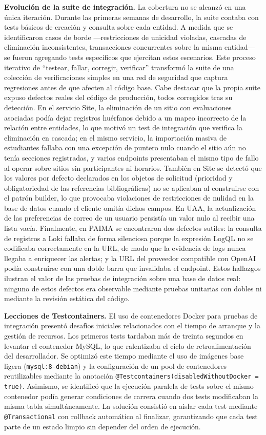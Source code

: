 \textbf{Evolución de la suite de integración.} La cobertura no se alcanzó en
una única iteración. Durante las primeras semanas de desarrollo, la suite
contaba con tests básicos de creación y consulta sobre cada entidad. A medida
que se identificaron casos de borde ---restricciones de unicidad violadas,
cascadas de eliminación inconsistentes, transacciones concurrentes sobre la
misma entidad--- se fueron agregando tests específicos que ejercitan estos
escenarios. Este proceso iterativo de ``testear, fallar, corregir,
verificar'' transformó la suite de una colección de verificaciones simples en
una red de seguridad que captura regresiones antes de que afecten al
código base. Cabe destacar que la propia suite expuso defectos reales del
código de producción, todos corregidos tras su detección. En el servicio Site,
la eliminación de un sitio con evaluaciones asociadas podía dejar registros
huérfanos debido a un mapeo incorrecto de la relación entre entidades, lo que
motivó un test de integración que verifica la eliminación en cascada; en el
mismo servicio, la importación masiva de estudiantes fallaba con una excepción
de puntero nulo cuando el sitio aún no tenía secciones registradas, y varios
endpoints presentaban el mismo tipo de fallo al operar sobre sitios sin
participantes ni horarios. También en Site se detectó que los valores por
defecto declarados en los objetos de solicitud (prioridad y obligatoriedad de
las referencias bibliográficas) no se aplicaban al construirse con el patrón
builder, lo que provocaba violaciones de restricciones de nulidad en la base
de datos cuando el cliente omitía dichos campos. En UAA, la actualización de
las preferencias de correo de un usuario persistía un valor nulo al recibir
una lista vacía. Finalmente, en PAIMA se encontraron dos defectos sutiles: la
consulta de registros a Loki fallaba de forma silenciosa porque la expresión
LogQL no se codificaba correctamente en la URL, de modo que la evidencia de
logs nunca llegaba a enriquecer las alertas; y la URL del proveedor compatible
con OpenAI podía construirse con una doble barra que invalidaba el endpoint.
Estos hallazgos ilustran el valor de las pruebas de integración sobre una base
de datos real: ninguno de estos defectos era observable mediante pruebas
unitarias con dobles ni mediante la revisión estática del código.

\textbf{Lecciones de Testcontainers.} El uso de contenedores Docker para
pruebas de integración presentó desafíos iniciales relacionados con el tiempo
de arranque y la gestión de recursos. Los primeros tests tardaban más de
treinta segundos en levantar el contenedor MySQL, lo que ralentizaba
el ciclo de retroalimentación del desarrollador. Se
optimizó este tiempo mediante el uso de imágenes base ligera
(\texttt{mysql:8-debian}) y la configuración de un pool de contenedores
reutilizables mediante la anotación
\texttt{@Testcontainers(disabledWithoutDocker = true)}. Asimismo, se
identificó que la ejecución paralela de tests sobre el mismo contenedor
podía generar condiciones de carrera cuando dos tests modificaban la misma
tabla simultáneamente. La solución consistió en aislar cada test mediante
\texttt{@Transactional} con rollback automático al finalizar, garantizando
que cada test parte de un estado limpio sin depender del orden de ejecución.


